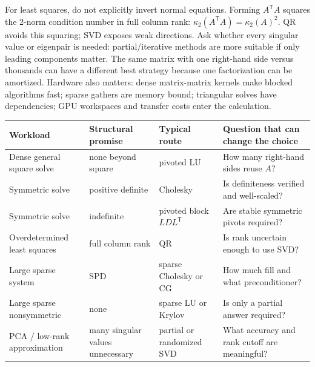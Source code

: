For least squares, do not explicitly invert normal equations. Forming \(A^\mathsf TA\) squares the 2-norm condition number in full column rank: \(\kappa_2(A^\mathsf TA)=\kappa_2(A)^2\). QR avoids this squaring; SVD exposes weak directions. Ask whether every singular value or eigenpair is needed: partial/iterative methods are more suitable if only leading components matter. The same matrix with one right-hand side versus thousands can have a different best strategy because one factorization can be amortized. Hardware also matters: dense matrix-matrix kernels make blocked algorithms fast; sparse gathers are memory bound; triangular solves have dependencies; GPU workspaces and transfer costs enter the calculation.

{\def\LTcaptype{none} %
\begin{longtable}[]{@{}
  >{\raggedright\arraybackslash}p{}
  >{\raggedright\arraybackslash}p{}
  >{\raggedright\arraybackslash}p{}
  >{\raggedright\arraybackslash}p{}@{}}
\toprule\noalign{}
\begin{minipage}[b]{\linewidth}\raggedright
Workload
\end{minipage} & \begin{minipage}[b]{\linewidth}\raggedright
Structural promise
\end{minipage} & \begin{minipage}[b]{\linewidth}\raggedright
Typical route
\end{minipage} & \begin{minipage}[b]{\linewidth}\raggedright
Question that can change the choice
\end{minipage} \\
\midrule\noalign{}
\endhead
\bottomrule\noalign{}
\endlastfoot
Dense general square solve & none beyond square & pivoted LU & How many right-hand sides reuse \(A\)? \\
Symmetric solve & positive definite & Cholesky & Is definiteness verified and well-scaled? \\
Symmetric solve & indefinite & pivoted block \(LDL^\mathsf T\) & Are stable symmetric pivots required? \\
Overdetermined least squares & full column rank & QR & Is rank uncertain enough to use SVD? \\
Large sparse system & SPD & sparse Cholesky or CG & How much fill and what preconditioner? \\
Large sparse nonsymmetric & none & sparse LU or Krylov & Is only a partial answer required? \\
PCA / low-rank approximation & many singular values unnecessary & partial or randomized SVD & What accuracy and rank cutoff are meaningful? \\
\end{longtable}
}


